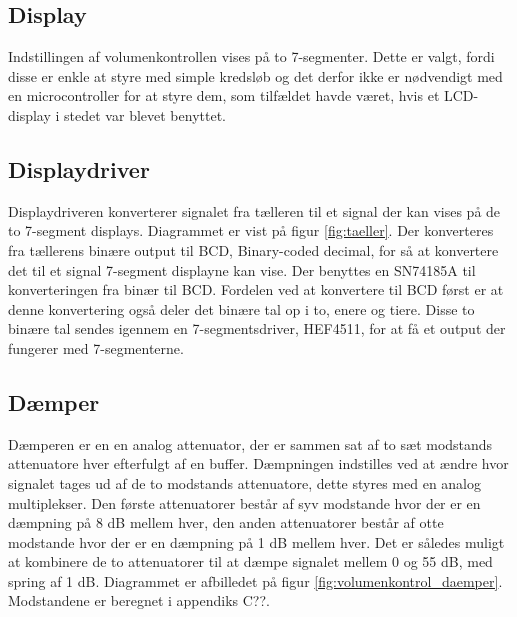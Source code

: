 \subsection*{Display}
\label{volumenkontrol-design-display}
Indstillingen af volumenkontrollen vises på to 7-segmenter. Dette er valgt, fordi disse er enkle at styre med simple kredsløb og det derfor ikke er nødvendigt med en microcontroller for at styre dem, som tilfældet havde været, hvis et LCD-display i stedet var blevet benyttet.

\subsection*{Displaydriver}
\label{volumenkontrol-design-display_driver}
Displaydriveren konverterer signalet fra tælleren til et signal der kan vises på de to 7-segment displays. Diagrammet er vist på figur \ref{fig:taeller}. Der konverteres fra tællerens binære output til BCD, Binary-coded decimal, for så at konvertere det til et signal 7-segment displayne kan vise. Der benyttes en SN74185A til konverteringen fra binær til BCD. Fordelen ved at konvertere til BCD først er at denne konvertering også deler det binære tal op i to, enere og tiere. Disse to binære tal sendes igennem en 7-segmentsdriver, HEF4511, for at få et output der fungerer med 7-segmenterne.

\subsection*{Dæmper}
\label{volumenkontrol-design-daemper}
Dæmperen er en en analog attenuator, der er sammen sat af to sæt modstands attenuatore hver efterfulgt af en buffer. Dæmpningen indstilles ved at ændre hvor signalet tages ud af de to modstands attenuatore, dette styres med en analog multiplekser. Den første attenuatorer består af syv modstande hvor der er en dæmpning på 8 dB mellem hver, den anden attenuatorer består af otte modstande hvor der er en dæmpning på 1 dB mellem hver. Det er således muligt at kombinere de to attenuatorer til at dæmpe signalet mellem 0 og 55 dB, med spring af 1 dB. Diagrammet er afbilledet på figur \ref{fig:volumenkontrol_daemper}. Modstandene er beregnet i appendiks C??.

